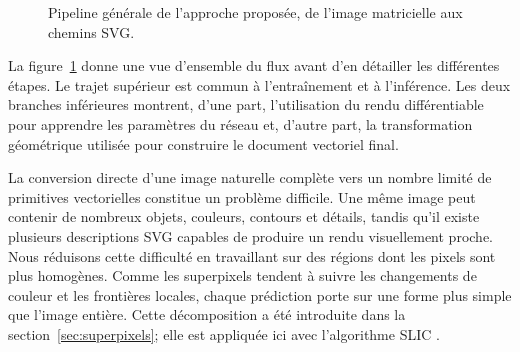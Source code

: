 \documentclass[12pt, a4paper, oneside]{report}
\begin{document}
\begin{figure}[H]
{%
    }

    \caption{Pipeline générale de l'approche proposée, de l'image matricielle aux chemins SVG.}
    \label{fig:pipeline_proposee}
\end{figure}

La figure~\ref{fig:pipeline_proposee} donne une vue d'ensemble du flux avant d'en détailler les différentes étapes. Le trajet supérieur est commun à l'entraînement et à l'inférence. Les deux branches inférieures montrent, d'une part, l'utilisation du rendu différentiable pour apprendre les paramètres du réseau et, d'autre part, la transformation géométrique utilisée pour construire le document vectoriel final.

La conversion directe d'une image naturelle complète vers un nombre limité de primitives vectorielles constitue un problème difficile. Une même image peut contenir de nombreux objets, couleurs, contours et détails, tandis qu'il existe plusieurs descriptions SVG capables de produire un rendu visuellement proche. Nous réduisons cette difficulté en travaillant sur des régions dont les pixels sont plus homogènes. Comme les superpixels tendent à suivre les changements de couleur et les frontières locales, chaque prédiction porte sur une forme plus simple que l'image entière. Cette décomposition a été introduite dans la section~\ref{sec:superpixels}; elle est appliquée ici avec l'algorithme SLIC \cite{achanta2012slic}.
\end{document}
